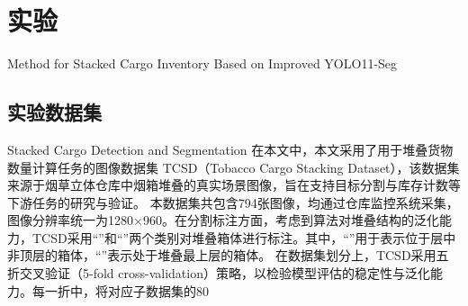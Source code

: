 ﻿\chapter{实验}{Method for Stacked Cargo Inventory Based on Improved YOLO11-Seg}

\section{实验数据集}{Stacked Cargo Detection and Segmentation}
在本文中，本文采用了用于堆叠货物数量计算任务的图像数据集 TCSD（Tobacco Cargo Stacking Dataset），该数据集来源于烟草立体仓库中烟箱堆叠的真实场景图像，旨在支持目标分割与库存计数等下游任务的研究与验证。
本数据集共包含794张图像，均通过仓库监控系统采集，图像分辨率统一为1280×960。在分割标注方面，考虑到算法对堆叠结构的泛化能力，TCSD采用“”和“”两个类别对堆叠箱体进行标注。其中，“”用于表示位于层中非顶层的箱体，“”表示处于堆叠最上层的箱体。
在数据集划分上，TCSD采用五折交叉验证（5-fold cross-validation）策略，以检验模型评估的稳定性与泛化能力。每一折中，将对应子数据集的80%
